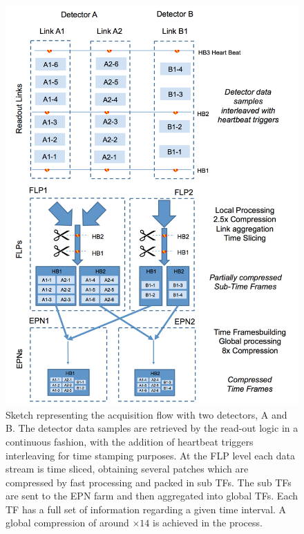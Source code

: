 \begin{figure}[]
\begin{center}
\includegraphics[width=0.9\linewidth]{Chapters/O2/Figs/TF.png}
\caption{Sketch representing the acquisition flow with two detectors, A and B. The detector data samples are retrieved by the read-out logic in a continuous fashion, with the addition of heartbeat triggers interleaving for time stamping purposes. At the FLP level each data stream is time sliced, obtaining several patches which are compressed by fast processing and packed in sub TFs. The sub TFs are sent to the EPN farm and then aggregated into global TFs. Each TF has a full set of information regarding a given time interval. A global compression of around $\times14$ is achieved in the process.}
\label{fig:O2_TF}
\end{center}
\end{figure}

